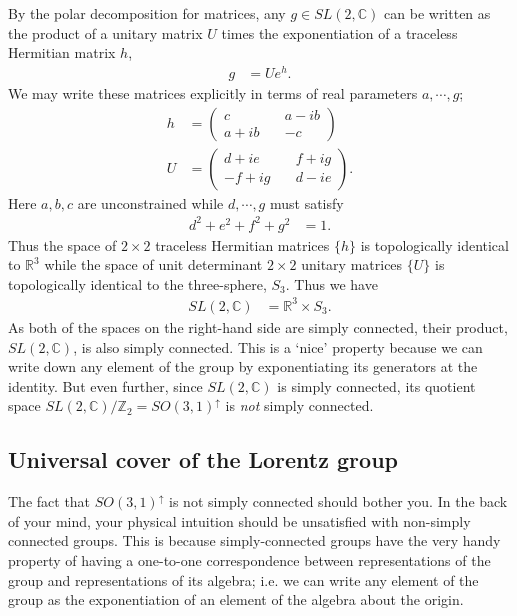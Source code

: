 By the polar decomposition for matrices, any $g \in SL(2,\mathbb C)$ can be written as the product of a unitary matrix $U$ times the exponentiation of a traceless Hermitian matrix $h$,
\begin{align}
    g &= U e^{h}.
\end{align}
We may write these matrices explicitly in terms of real parameters $a,\cdots,g$;
\begin{align}
     h &= \begin{pmatrix}c \quad& a-ib\\ a+ib \quad& -c\end{pmatrix}\\
     U &= \begin{pmatrix}d+ie \quad& f+ig\\-f+ig \quad& d-ie\end{pmatrix}.
\end{align}
Here $a,b,c$ are unconstrained while $d,\cdots,g$ must satisfy
\begin{align}
    d^2+e^2+f^2+g^2 &= 1.
\end{align}
Thus the space of $2\times 2$ traceless Hermitian matrices $\{h\}$ is topologically identical to $\mathbb R^3$ while the space of unit determinant $2\times 2$ unitary matrices $\{U\}$ is topologically identical to the three-sphere, $S_3$. Thus we have
\begin{align}
    SL(2,\mathbb C) &= \mathbb R^3 \times S_3.
\end{align}
As both of the spaces on the right-hand side are simply connected, their product, $SL(2,\mathbb C)$, is also simply connected. This is a `nice' property because we can write down any element of the group by exponentiating its generators at the identity. But even further, since $SL(2,\mathbb C)$ is simply connected, its quotient space $SL(2,\mathbb C)/\mathbb Z_2 = SO(3,1)^\uparrow$ is \emph{not} simply connected.




\subsection{Universal cover of the Lorentz group}\label{sec:SUSYalg:universal:cover}

The fact that $SO(3,1)^\uparrow$ is not simply connected should bother you. In the back of your mind, your physical intuition should be unsatisfied with non-simply connected groups. This is because simply-connected groups have the very handy property of having a one-to-one correspondence between representations of the group and representations of its algebra; i.e. we can write any element of the group as the exponentiation of an element of the algebra about the origin. 

